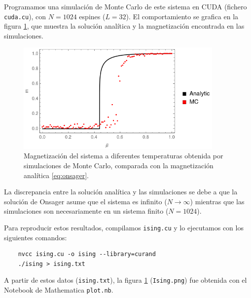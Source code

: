\documentclass{article}
\begin{document}
Programamos una simulación de Monte Carlo de este sistema en CUDA (fichero \texttt{cuda.cu}), con $N=1024$ espines ($L=32$).
El comportamiento se grafica en la figura \ref{fig:ising}, que muestra la solución analítica y la magnetización encontrada en las simulaciones.

\begin{figure}
    \centering
    \includegraphics[width=0.9\textwidth]{Ising.png}
    \caption{\label{fig:ising} Magnetización del sistema a diferentes temperaturas obtenida por simulaciones de Monte Carlo, comparada con la magnetización analítica \eqref{eq:onsager}.}
\end{figure}

La discrepancia entre la solución analítica y las simulaciones se debe a que la solución de Onsager asume que el sistema es infinito ($N\rightarrow\infty$) mientras que las simulaciones son necesariamente en un sistema finito ($N=1024$).

Para reproducir estos resultados, compilamos \verb|ising.cu| y lo ejecutamos con los siguientes comandos:

\begin{verbatim}
    nvcc ising.cu -o ising --library=curand
    ./ising > ising.txt    
\end{verbatim}

A partir de estos datos (\verb|ising.txt|), la figura \ref{fig:ising} (\verb|Ising.png|) fue obtenida con el Notebook de Mathematica \verb|plot.nb|.
\end{document}
